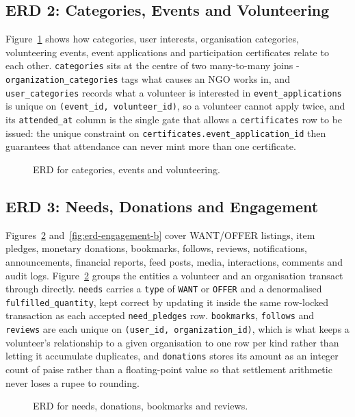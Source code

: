 \subsection{ERD 2: Categories, Events and Volunteering}

Figure~\ref{fig:erd-events} shows how categories, user interests, organisation categories, volunteering events, event applications and participation certificates relate to each other. \texttt{categories} sits at the centre of two many-to-many joins - \texttt{organization\_categories} tags what causes an NGO works in, and \texttt{user\_categories} records what a volunteer is interested in \texttt{event\_applications} is unique on \texttt{(event\_id, volunteer\_id)}, so a volunteer cannot apply twice, and its \texttt{attended\_at} column is the single gate that allows a \texttt{certificates} row to be issued: the unique constraint on \texttt{certificates.event\_application\_id} then guarantees that attendance can never mint more than one certificate.

\begin{figure}[H]
    \centering
    \caption{ERD for categories, events and volunteering.}
    \label{fig:erd-events}
\end{figure}

\subsection{ERD 3: Needs, Donations and Engagement}

Figures~\ref{fig:erd-engagement-a} and~\ref{fig:erd-engagement-b} cover WANT/OFFER listings, item pledges, monetary donations, bookmarks, follows, reviews, notifications, announcements, financial reports, feed posts, media, interactions, comments and audit logs. Figure~\ref{fig:erd-engagement-a} groups the entities a volunteer and an organisation transact through directly. \texttt{needs} carries a \texttt{type} of \texttt{WANT} or \texttt{OFFER} and a denormalised \texttt{fulfilled\_quantity}, kept correct by updating it inside the same row-locked transaction as each accepted \texttt{need\_pledges} row. \texttt{bookmarks}, \texttt{follows} and \texttt{reviews} are each unique on \texttt{(user\_id, organization\_id)}, which is what keeps a volunteer's relationship to a given organisation to one row per kind rather than letting it accumulate duplicates, and \texttt{donations} stores its amount as an integer count of paise rather than a floating-point value so that settlement arithmetic never loses a rupee to rounding.
\begin{figure}[H]
    \centering
    \caption{ERD for needs, donations, bookmarks and reviews.}
    \label{fig:erd-engagement-a}
\end{figure}

